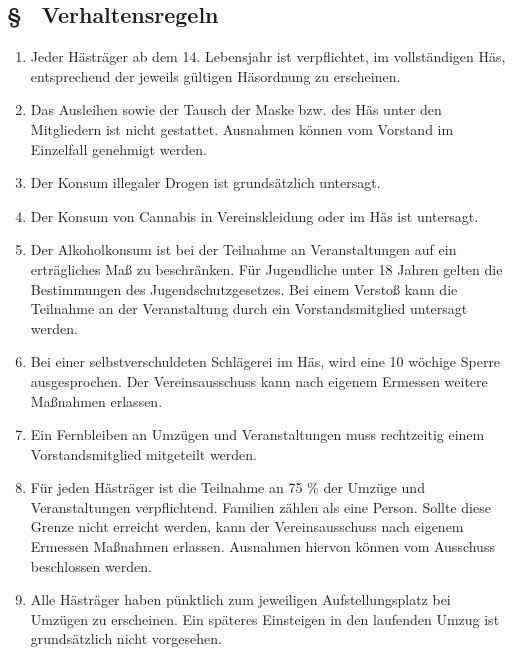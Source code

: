 \subsection{§ \thegoparagraphcounter\ Verhaltensregeln} \label{go:par:verhaltensregeln}
\begin{enumerate}
    \item \label{go:abs:gqzfdq} Jeder Hästräger ab dem 14. Lebensjahr ist verpflichtet, im vollständigen Häs, entsprechend der jeweils gültigen Häsordnung zu erscheinen.

    \item \label{go:abs:egp5vc} Das Ausleihen sowie der Tausch der Maske bzw. des Häs unter den Mitgliedern ist nicht gestattet. Ausnahmen können vom Vorstand im Einzelfall genehmigt werden.

    \item \label{go:abs:rdu1j3} Der Konsum illegaler Drogen ist grundsätzlich untersagt.

    \item \label{go:abs:lqdpi4} Der Konsum von Cannabis in Vereinskleidung oder im Häs ist untersagt.

    \item \label{go:abs:j3n0vb} Der Alkoholkonsum ist bei der Teilnahme an Veranstaltungen auf ein erträgliches Maß zu beschränken. Für Jugendliche unter 18 Jahren gelten die Bestimmungen des Jugendschutzgesetzes. Bei einem Verstoß kann die Teilnahme an der Veranstaltung durch ein Vorstandsmitglied untersagt werden.

    \item \label{go:abs:prjq6f} Bei einer selbstverschuldeten Schlägerei im Häs, wird eine 10 wöchige Sperre ausgesprochen. Der Vereinsausschuss kann nach eigenem Ermessen weitere Maßnahmen erlassen.

    \item \label{go:abs:7bp32s} Ein Fernbleiben an Umzügen und Veranstaltungen muss rechtzeitig einem Vorstandsmitglied mitgeteilt werden.

    \item \label{go:abs:zmmaom} Für jeden Hästräger ist die Teilnahme an 75 \% der Umzüge und Veranstaltungen verpflichtend. Familien zählen als eine Person. Sollte diese Grenze nicht erreicht werden, kann der Vereinsausschuss nach eigenem Ermessen Maßnahmen erlassen. Ausnahmen hiervon können vom Ausschuss beschlossen werden.

    \item \label{go:abs:hnnpec} Alle Hästräger haben pünktlich zum jeweiligen Aufstellungsplatz bei Umzügen zu erscheinen. Ein späteres Einsteigen in den laufenden Umzug ist grundsätzlich nicht vorgesehen.


\end{enumerate}
